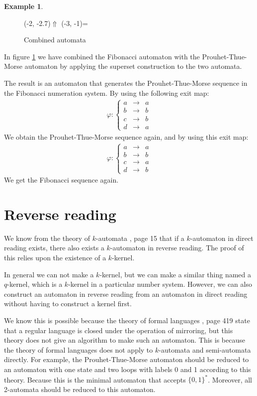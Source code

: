 \documentclass{article}
\theoremstyle{definition}
\newtheorem{example}[theorem]{Example}
\begin{document}
\begin{example}
\begin{figure}[p]
\begin{graph}
  \freetext(-2, -2.7){$\Uparrow$}
  \freetext(-3, -1){=}
\end{graph}
\caption{Combined automata}
\label{fig:combined}
\end{figure}

In figure \ref{fig:combined} we have combined the Fibonacci automaton with the 
Prouhet-Thue-Morse automaton by applying the superset construction to the two 
automata.

The result is an automaton that generates the Prouhet-Thue-Morse sequence in 
the Fibonacci numeration system. By using the following exit map:
\begin{eqnarray*}
\varphi: \left\{ \begin{array}{lll}
a &\rightarrow& a\\
b &\rightarrow& b\\
c &\rightarrow& b\\
d &\rightarrow& a
\end{array} \right.
\end{eqnarray*}
We obtain the Prouhet-Thue-Morse sequence again, and by using this exit map:
\begin{eqnarray*}
\varphi: \left\{ \begin{array}{lll}
a &\rightarrow& a\\
b &\rightarrow& b\\
c &\rightarrow& a\\
d &\rightarrow& b
\end{array} \right.
\end{eqnarray*}
We get the Fibonacci sequence again.
\end{example}

\section{Reverse reading}
We know from the theory of $k$-automata \cite{Fogg}, page 15 that if a 
$k$-automaton in direct reading exists, there also exists a $k$-automaton in 
reverse reading. The proof of this relies upon the existence of a $k$-kernel.

In general we can not make a $k$-kernel, but we can make a similar thing named
a $q$-kernel, which is a $k$-kernel in a particular number system. However, we 
can also construct an automaton in reverse reading from an automaton in direct 
reading without having to construct a kernel first.

We know this is possible because the theory of formal languages \cite{Wood}, 
page 419 state that a regular language is closed under the operation of 
mirroring, but this theory does not give an algorithm to make such an 
automaton. This is because the theory of formal languages does not apply to 
$k$-automata and semi-automata directly. For example, the Prouhet-Thue-Morse 
automaton should be reduced to an automaton with one state and two loops with 
labels 0 and 1 according to this theory. Because this is the minimal automaton 
that accepts $\{0, 1\}^*$. Moreover, all 2-automata should be reduced to this 
automaton.
\end{document}

